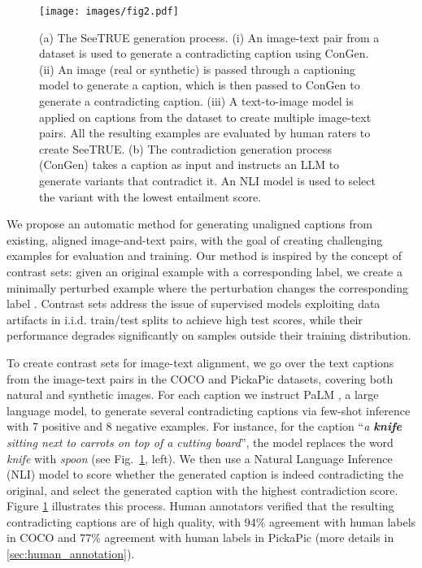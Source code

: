 \documentclass{article}
\begin{document}
\begin{figure}
    \centering
    \texttt{[image: images/fig2.pdf]}
    \caption{
    (a) The SeeTRUE generation process. (i) An image-text pair from a dataset is used to generate a contradicting caption using ConGen. (ii) An image (real or synthetic) is passed through a captioning model to generate a caption, which is then passed to ConGen to generate a contradicting caption. (iii) A text-to-image model is applied on captions from the dataset to create multiple image-text pairs. All the resulting examples are evaluated by human raters to create SeeTRUE. 
    (b) The contradiction generation process (ConGen) takes a caption as input and instructs an LLM to generate variants that contradict it. An NLI model is used to select the variant with the lowest entailment score. }
    \label{fig:fig_contrast_sets}
\end{figure} We propose an automatic method for generating unaligned captions from existing, aligned image-and-text pairs, with the goal of creating challenging examples for evaluation and training. Our method is inspired by the concept of contrast sets: given an original example with a corresponding label, we create a minimally perturbed example where the perturbation changes the corresponding label \citep{gardner2020evaluating, bitton2021automatic, li-etal-2020-linguistically, rosenman-etal-2020-exposing}. Contrast sets address the issue of supervised models exploiting data artifacts in i.i.d. train/test splits to achieve high test scores, while their performance degrades significantly on samples outside their training distribution. 

To create contrast sets for image-text alignment, we go over the text captions from the image-text pairs in the COCO and PickaPic datasets, covering both natural and synthetic images. For each caption we instruct PaLM \citep{chowdhery2022palm}, a large language model, to generate several contradicting captions via few-shot inference with 7 positive and 8 negative examples. For instance, for the caption ``\textit{a \textbf{knife} sitting next to carrots on top of a cutting board}'', the model replaces the word \emph{knife} with \emph{spoon} (see Fig.~\ref{fig:fig_contrast_sets}, left). We then use a Natural Language Inference (NLI) model \cite{honovich2021q} to score whether the generated caption is indeed contradicting the original, and select the generated caption with the highest contradiction score. Figure \ref{fig:fig_contrast_sets} illustrates this process. Human annotators verified that the resulting contradicting captions are of high quality, with 94\% agreement with human labels in COCO and 77\% agreement with human labels in PickaPic (more details in \cref{sec:human_annotation}).
 
\end{document}
